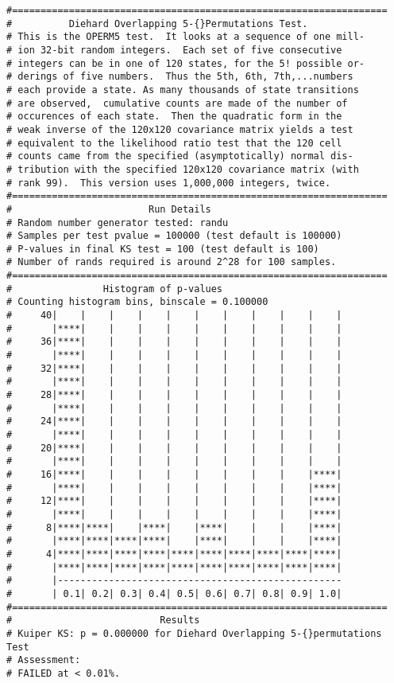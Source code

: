 \documentclass{book}
\begin{document}
{\begin{verbatim}
#==================================================================
#          Diehard Overlapping 5-{}Permutations Test.
# This is the OPERM5 test.  It looks at a sequence of one mill- 
# ion 32-bit random integers.  Each set of five consecutive     
# integers can be in one of 120 states, for the 5! possible or- 
# derings of five numbers.  Thus the 5th, 6th, 7th,...numbers   
# each provide a state. As many thousands of state transitions  
# are observed,  cumulative counts are made of the number of    
# occurences of each state.  Then the quadratic form in the     
# weak inverse of the 120x120 covariance matrix yields a test   
# equivalent to the likelihood ratio test that the 120 cell     
# counts came from the specified (asymptotically) normal dis-   
# tribution with the specified 120x120 covariance matrix (with  
# rank 99).  This version uses 1,000,000 integers, twice.       
#==================================================================
#                        Run Details
# Random number generator tested: randu
# Samples per test pvalue = 100000 (test default is 100000)
# P-values in final KS test = 100 (test default is 100)
# Number of rands required is around 2^28 for 100 samples.
#==================================================================
#                Histogram of p-values
# Counting histogram bins, binscale = 0.100000
#     40|    |    |    |    |    |    |    |    |    |    |
#       |****|    |    |    |    |    |    |    |    |    |
#     36|****|    |    |    |    |    |    |    |    |    |
#       |****|    |    |    |    |    |    |    |    |    |
#     32|****|    |    |    |    |    |    |    |    |    |
#       |****|    |    |    |    |    |    |    |    |    |
#     28|****|    |    |    |    |    |    |    |    |    |
#       |****|    |    |    |    |    |    |    |    |    |
#     24|****|    |    |    |    |    |    |    |    |    |
#       |****|    |    |    |    |    |    |    |    |    |
#     20|****|    |    |    |    |    |    |    |    |    |
#       |****|    |    |    |    |    |    |    |    |    |
#     16|****|    |    |    |    |    |    |    |    |****|
#       |****|    |    |    |    |    |    |    |    |****|
#     12|****|    |    |    |    |    |    |    |    |****|
#       |****|    |    |    |    |    |    |    |    |****|
#      8|****|****|    |****|    |****|    |    |    |****|
#       |****|****|****|****|    |****|    |    |    |****|
#      4|****|****|****|****|****|****|****|****|****|****|
#       |****|****|****|****|****|****|****|****|****|****|
#       |--------------------------------------------------
#       | 0.1| 0.2| 0.3| 0.4| 0.5| 0.6| 0.7| 0.8| 0.9| 1.0|
#==================================================================
#                          Results
# Kuiper KS: p = 0.000000 for Diehard Overlapping 5-{}permutations Test
# Assessment:
# FAILED at < 0.01%.


\end{verbatim}}
\end{document}
